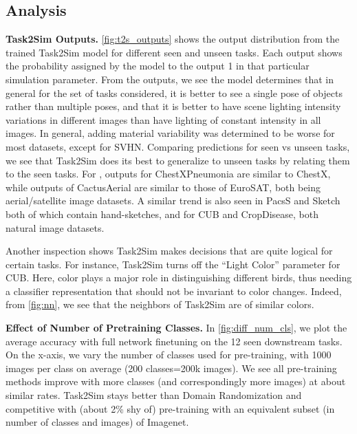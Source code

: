 \subsection{Analysis} \label{subsec:analysis}
\noindent \textbf{Task2Sim Outputs.}
\cref{fig:t2s_outputs} shows the output distribution from the trained Task2Sim model for different seen and unseen tasks. Each output shows the probability assigned by the model to the output 1 in that particular simulation parameter. From the outputs, we see the model determines that in general for the set of tasks considered, it is better to see a single pose of objects rather than multiple poses, and that it is better to have scene lighting intensity variations in different images than have lighting of constant intensity in all images. In general, adding material variability was determined to be worse for most datasets, except for SVHN. Comparing predictions for seen vs unseen tasks, we see that Task2Sim does its best to generalize to unseen tasks by relating them to the seen tasks. 
For \eg, outputs for ChestXPneumonia are similar to ChestX, while outputs of CactusAerial are similar to those of EuroSAT, both being aerial/satellite image datasets. A similar trend is also seen in PacsS and Sketch both of which contain hand-sketches, and for CUB and CropDisease, both natural image datasets.



Another inspection shows Task2Sim makes decisions that are quite logical for certain tasks. For instance, Task2Sim turns off the ``Light Color'' parameter for CUB. Here, color plays a major role in distinguishing different birds, thus needing a classifier representation that should not be invariant to color changes. Indeed, from \cref{fig:nn}, we see that the neighbors of Task2Sim are of similar colors. 










\vspace{1mm}
\noindent \textbf{Effect of Number of Pretraining Classes.}
In \cref{fig:diff_num_cls}, we plot the average accuracy with full network finetuning on the 12 seen downstream tasks. On the x-axis, we vary the number of classes used for pre-training, with 1000 images per class on average (200 classes=200k images). We see all pre-training methods improve with more classes (and correspondingly more images) at about similar rates. Task2Sim stays better than Domain Randomization and competitive with (about 2\% shy of) pre-training with an equivalent subset (in number of classes and images) of Imagenet.



